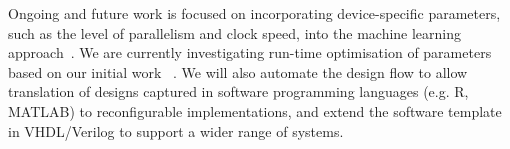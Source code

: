 Ongoing and future work is focused on incorporating device-specific parameters, such as the level of parallelism and clock speed, into the machine learning approach~\cite{kurek14}.
We are currently investigating run-time optimisation of parameters based on our initial work ~\cite{chau13a}.
We will also automate the design flow to allow translation of designs captured in software programming languages (e.g. R, MATLAB) to reconfigurable implementations,
and extend the software template in VHDL/Verilog to support a wider range of systems.

